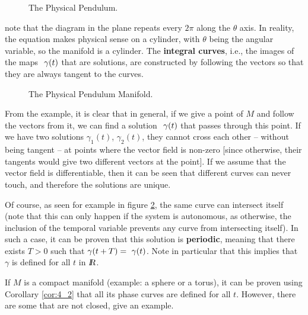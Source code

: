 \begin{figure}[htbp]
  \begin{center}
    \caption{The Physical Pendulum.}
    \label{fig:4_6}
  \end{center}
\end{figure}

\noi
note that the diagram in the plane repeats every $2\pi$ along the $\theta$ axis.
In reality, the equation makes physical sense on a
cylinder, with $\theta$ being the angular variable, 
so the manifold is a cylinder. 
The {\bf integral curves}, i.e., the images of the maps $\mbox{ $\gamma (t)$}$ that are
solutions,
are constructed by following the vectors so that they are
always tangent to the curves.


\begin{figure}[htbp]
  \begin{center}
    \caption{The Physical Pendulum Manifold.}
    \label{fig:4_7}
  \end{center}
\end{figure}

From the example, it is clear that in general, if we give a point of $M$
and follow the vectors from it, we can find 
a solution $\mbox{ $\gamma (t)$}$ that passes through this point. 
If we have two solutions $\gamma_1(t)$,
$\gamma_2(t)$, they cannot cross each other -- without being tangent -- at
points where the vector field is non-zero [since
otherwise, their tangents would give two different vectors at the point].
If we assume that the vector field is differentiable, then it can be
seen that different curves can never touch, and therefore the
solutions are unique.

Of course, as seen for example in figure \ref{fig:4_7}, 
the same curve can intersect itself (note that this can only happen
if the system is autonomous, as otherwise, the inclusion of
the temporal variable prevents any curve from intersecting itself). 
In such a case, it can be proven that this solution is
{\bf periodic}, meaning that there exists $T>0$ such that $\gamma(t+T)=\mbox{ $\gamma (t)$}$. Note
in particular that this implies that $\gamma$ is defined for all
$t$ in $\mbox{\sl {l$\!\!\!\;\:\!$R}}$.

\espa \noi
\bpro If $M$ is a compact manifold (example: a sphere
or a torus), it can be proven using Corollary \ref{cor:4_2} that all 
its phase curves are defined for all $t$. 
However, there are some that are not
closed, give an example.
\epro

